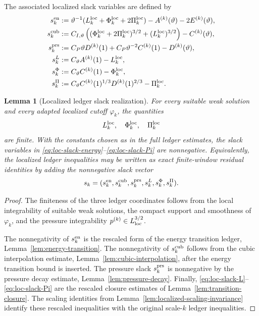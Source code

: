 \documentclass[11pt]{article}
\numberwithin{equation}{section}
\newtheorem{lemma}[theorem]{Lemma}
\begin{document}
The associated localized slack variables are defined by
\begin{align}
        s_k^{\rm en}
        &:=
        \vartheta^{-1}
        (L_k^{\rm loc}+\Phi_k^{\rm loc}+2\Pi_k^{\rm loc})
        -
        A^{(k)}(\vartheta)-2E^{(k)}(\vartheta),\label{eq:loc-slack-energy}\\
        s_k^{\rm cub}
        &:=
        C_{I,\vartheta}
        \left(
        (\Phi_k^{\rm loc}+2\Pi_k^{\rm loc})^{3/2}
        +(L_k^{\rm loc})^{3/2}
        \right)
        -
        C^{(k)}(\vartheta),\label{eq:loc-slack-cubic}\\
        s_k^{\rm prs}
        &:=
        C_P\vartheta D^{(k)}(1)
        +
        C_P\vartheta^{-2}C^{(k)}(1)
        -
        D^{(k)}(\vartheta),\label{eq:loc-slack-pressure}\\
        s_k^L
        &:=
        C_\vartheta A^{(k)}(1)-L_k^{\rm loc},\label{eq:loc-slack-L}\\
        s_k^\Phi
        &:=
        C_\vartheta C^{(k)}(1)-\Phi_k^{\rm loc},\label{eq:loc-slack-Phi}\\
        s_k^\Pi
        &:=
        C_\vartheta
        C^{(k)}(1)^{1/3}D^{(k)}(1)^{2/3}
        -
        \Pi_k^{\rm loc}.\label{eq:loc-slack-Pi}
\end{align}

\begin{lemma}[Localized ledger slack realization]\label{lem:localized-ledger-slack}
For every suitable weak solution and every adapted localized cutoff
\(\varphi_k\), the quantities
\[
        L_k^{\rm loc},\quad
        \Phi_k^{\rm loc},\quad
        \Pi_k^{\rm loc}
\]
are finite.  With the constants chosen as in the full ledger estimates,
the slack variables in
\eqref{eq:loc-slack-energy}--\eqref{eq:loc-slack-Pi} are nonnegative.
Equivalently, the localized ledger inequalities may be written as exact
finite-window residual identities by adding the nonnegative slack vector
\[
        s_k
        =
        (s_k^{\rm en},s_k^{\rm cub},s_k^{\rm prs},
        s_k^L,s_k^\Phi,s_k^\Pi).
\]
\end{lemma}

\begin{proof}
The finiteness of the three ledger coordinates follows from the local
integrability of suitable weak solutions, the compact support and
smoothness of \(\varphi_k\), and the pressure integrability
\(p^{(k)}\in L^{3/2}_{\rm loc}\).

The nonnegativity of \(s_k^{\rm en}\) is the rescaled form of the energy
transition ledger, Lemma~\ref{lem:energy-transition}.  The nonnegativity of
\(s_k^{\rm cub}\) follows from the cubic interpolation estimate,
Lemma~\ref{lem:cubic-interpolation}, after the energy transition bound is
inserted.  The pressure slack \(s_k^{\rm prs}\) is nonnegative by the
pressure decay estimate, Lemma~\ref{lem:pressure-decay}.  Finally,
\eqref{eq:loc-slack-L}--\eqref{eq:loc-slack-Pi} are the rescaled closure
estimates of Lemma~\ref{lem:transition-closure}.  The scaling identities
from Lemma~\ref{lem:localized-scaling-invariance} identify these rescaled
inequalities with the original scale-\(k\) ledger inequalities.
\end{proof}
\end{document}
